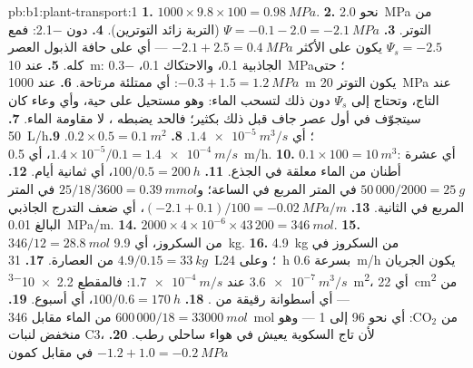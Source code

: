 \begin{solution}{pb:b1:plant-transport:1}
\textbf{1.} $1000\times 9.8\times 100 = \qty{0.98}{MPa}$.
\textbf{2.} نحو \qty{2.0}{MPa} من التوتر.
\textbf{3.} $\Psi = -0.1 - 2.0 = \qty{-2.1}{MPa}$ (التربة زائد
التوترين).
\textbf{4.} دون \qty{-2.1}{}: فمع $\Psi_s = -2.5$ يكون  على
الأكثر $-2.1 + 2.5 = \qty{0.4}{MPa}$ --- أي  على حافة الذبول
العصر كله.
\textbf{5.} عند \qty{10}{m}: الجاذبية \qty{0.1}{}، والاحتكاك
\qty{0.1}{}،  \qty{-0.3}{MPa}؛   حتى $-0.3 + 1.5 = \qty{1.2}{MPa}$:
أي ممتلئة مرتاحة.
\textbf{6.} عند \qty{1000}{m} يكون التوتر \qty{20}{MPa} عند التاج،
وتحتاج  إلى $\Psi_s$ دون ذلك لتسحب الماء: وهو مستحيل على
 حية، وأي وعاء كان سيتجوّف في أول عصر جاف قبل ذلك بكثير؛
فالحد يضبطه  ، لا مقاومة الماء.
\textbf{7.} \qty{50}{L/h}؛ أي $\qty{1.4e-5}{m^3/s}$.
\textbf{8.} $0.2\times 0.5 = \qty{0.1}{m^2}$.
\textbf{9.} $1.4\times 10^{-5}/0.1 = \qty{1.4e-4}{m/s}$، أي \qty{0.5}{m/h}.
\textbf{10.} $0.1\times 100 = \qty{10}{m^3}$: أي عشرة أطنان من الماء معلقة في الجذع.
\textbf{11.} $100/0.5 = \qty{200}{h}$، أي ثمانية أيام.
\textbf{12.} $50\,000/2000 = \qty{25}{g}$ في المتر المربع في الساعة؛
و$25/18/3600 = \qty{0.39}{mmol}$ في المتر المربع في الثانية.
\textbf{13.} $(-2.1 + 0.1)/100 = \qty{-0.02}{MPa/m}$، أي ضعف التدرج
الجاذبي البالغ \qty{0.01}{MPa/m}.
\textbf{14.} $2000\times 4\times 10^{-6}\times 43\,200 = \qty{346}{mol}$.
\textbf{15.} $346/12 = \qty{28.8}{mol}$ من السكروز، أي \qty{9.9}{kg}.
\textbf{16.} \qty{4.9}{kg} من السكروز في $4.9/0.15 = \qty{33}{kg}$ من
العصارة.
\textbf{17.} \qty{31}{L}؛ وعلى \qty{24}{h} بسرعة \qty{0.6}{m/h} يكون
الجريان $\qty{3.6e-7}{m^3/s}$ عند $\qty{1.7e-4}{m/s}$: فالمقطع
\qty{2.2e-3}{m^2}، أي \qty{22}{cm^2} من  --- أي
أسطوانة رقيقة من .
\textbf{18.} $100/0.6 = \qty{170}{h}$، أي أسبوع.
\textbf{19.} $600\,000/18 = \qty{33000}{mol}$ من الماء مقابل
\qty{346}{mol} من $\mathrm{CO_2}$: أي نحو 96 إلى 1 --- وهو منخفض
لنبات C3، لأن تاج السكوية يعيش في هواء ساحلي رطب.
\textbf{20.} $-1.2 + 1.0 = \qty{-0.2}{MPa}$ في مقابل كمون 

\end{solution}
